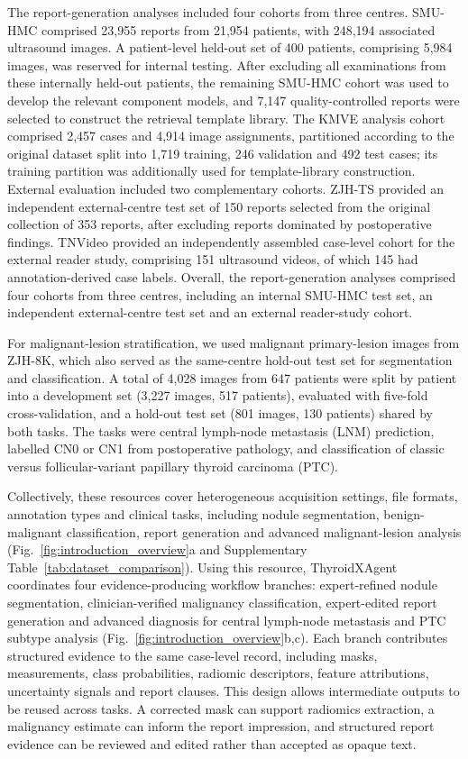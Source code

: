 \documentclass[fleqn,10pt]{wlscirep}
\begin{document}
The report-generation analyses included four cohorts from three centres. SMU-HMC comprised 23,955 reports from 21,954 patients, with 248,194 associated ultrasound images. A patient-level held-out set of 400 patients, comprising 5,984 images, was reserved for internal testing. After excluding all examinations from these internally held-out patients, the remaining SMU-HMC cohort was used to develop the relevant component models, and 7,147 quality-controlled reports were selected to construct the retrieval template library. The KMVE analysis cohort~\cite{li_ultrasound_2024} comprised 2,457 cases and 4,914 image assignments, partitioned according to the original dataset split into 1,719 training, 246 validation and 492 test cases; its training partition was additionally used for template-library construction. External evaluation included two complementary cohorts. ZJH-TS provided an independent external-centre test set of 150 reports selected from the original collection of 353 reports, after excluding reports dominated by postoperative findings. TNVideo provided an independently assembled case-level cohort for the external reader study, comprising 151 ultrasound videos, of which 145 had annotation-derived case labels. Overall, the report-generation analyses comprised four cohorts from three centres, including an internal SMU-HMC test set, an independent external-centre test set and an external reader-study cohort.

For malignant-lesion stratification, we used malignant primary-lesion images from ZJH-8K, which also served as the same-centre hold-out test set for segmentation and classification. A total of 4,028 images from 647 patients were split by patient into a development set (3,227 images, 517 patients), evaluated with five-fold cross-validation, and a hold-out test set (801 images, 130 patients) shared by both tasks. The tasks were central lymph-node metastasis (LNM) prediction, labelled CN0 or CN1 from postoperative pathology, and classification of classic versus follicular-variant papillary thyroid carcinoma (PTC).

Collectively, these resources cover heterogeneous acquisition settings, file formats, annotation types and clinical tasks, including nodule segmentation, benign-malignant classification, report generation and advanced malignant-lesion analysis (Fig.~\ref{fig:introduction_overview}a and Supplementary Table~\ref{tab:dataset_comparison}). Using this resource, ThyroidXAgent coordinates four evidence-producing workflow branches: expert-refined nodule segmentation, clinician-verified malignancy classification, expert-edited report generation and advanced diagnosis for central lymph-node metastasis and PTC subtype analysis (Fig.~\ref{fig:introduction_overview}b,c). Each branch contributes structured evidence to the same case-level record, including masks, measurements, class probabilities, radiomic descriptors, feature attributions, uncertainty signals and report clauses. This design allows intermediate outputs to be reused across tasks. A corrected mask can support radiomics extraction, a malignancy estimate can inform the report impression, and structured report evidence can be reviewed and edited rather than accepted as opaque text.
\end{document}
